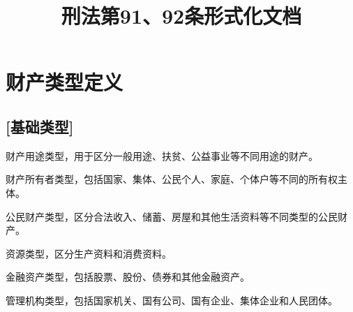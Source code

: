 \title{刑法第91、92条形式化文档}




\maketitle


\tableofcontents
\section{财产类型定义}

\subsection{[基础类型]}

\begin{definition}\label{PropertyPurpose}
\leanok
{}
\uses{}
财产用途类型，用于区分一般用途、扶贫、公益事业等不同用途的财产。
\end{definition}

\begin{definition}\label{OwnerType}
\leanok
{}
\uses{}
财产所有者类型，包括国家、集体、公民个人、家庭、个体户等不同的所有权主体。
\end{definition}

\begin{definition}\label{CitizenPropertyType}
\leanok
{}
\uses{}
公民财产类型，区分合法收入、储蓄、房屋和其他生活资料等不同类型的公民财产。
\end{definition}

\begin{definition}\label{ResourceType}
\leanok
{}
\uses{}
资源类型，区分生产资料和消费资料。
\end{definition}

\begin{definition}\label{FinancialAsset}
\leanok
{}
\uses{}
金融资产类型，包括股票、股份、债券和其他金融资产。
\end{definition}

\begin{definition}\label{ManagementInstitution}
\leanok
{}
\uses{}
管理机构类型，包括国家机关、国有公司、国有企业、集体企业和人民团体。
\end{definition}

